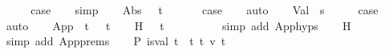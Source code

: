 \begin{isabellebody}
\ \ \isamarkupfalse%
\ \isamarkupfalse%
\ {\isacharquery}{\kern0pt}case\isanewline
\ \ \isamarkupfalse%
\ simp\isanewline
{}\isamarkupfalse%
\isanewline
\ \ \isamarkupfalse%
\ {\isacharparenleft}{\kern0pt}Abs\ {\isasymtau}{}\ {\isasymGamma}\ t\ {\isasymtau}{}{\isacharparenright}{\kern0pt}\isanewline
\ \ \isamarkupfalse%
\ \isamarkupfalse%
\ {\isacharquery}{\kern0pt}case\isanewline
\ \ \isamarkupfalse%
\ auto\isanewline
{}\isamarkupfalse%
\isanewline
\ \ \isamarkupfalse%
\ {\isacharparenleft}{\kern0pt}Val\ {\isasymGamma}{\isacharprime}{\kern0pt}\ s{\isacharparenright}{\kern0pt}\isanewline
\ \ \isamarkupfalse%
\ \isamarkupfalse%
\ {\isacharquery}{\kern0pt}case\isanewline
\ \ \isamarkupfalse%
\ auto\isanewline
{}\isamarkupfalse%
\isanewline
\ \ \isamarkupfalse%
\ {\isacharparenleft}{\kern0pt}App\ {\isasymGamma}{\isacharprime}{\kern0pt}\ t{}\ {\isasymtau}{}\ {\isasymtau}{}\ t{}{\isacharparenright}{\kern0pt}\isanewline
\ \ \isamarkupfalse%
\ H{}{\isacharcolon}{\kern0pt}\ {\isachardoublequoteopen}{\isasymGamma}{\isacharprime}{\kern0pt}\ {\isasymturnstile}\ t{}\ {\isacharcolon}{\kern0pt}\ {\isasymtau}{}\ {\isasymRightarrow}\ {\isasymtau}{}{\isachardoublequoteclose}\isanewline
\ \ \ \ \isamarkupfalse%
\ {\isacharparenleft}{\kern0pt}simp\ add{\isacharcolon}{\kern0pt}\ App{\isachardot}{\kern0pt}hyps{\isacharparenleft}{\kern0pt}{}{\isacharparenright}{\kern0pt}{\isacharparenright}{\kern0pt}\isanewline
\ \ \isamarkupfalse%
\ H{}{\isacharcolon}{\kern0pt}\ {\isachardoublequoteopen}{\isasymGamma}{\isacharprime}{\kern0pt}\ {\isacharequal}{\kern0pt}\ {\isacharbrackleft}{\kern0pt}{\isacharbrackright}{\kern0pt}{\isachardoublequoteclose}\isanewline
\ \ \ \ \isamarkupfalse%
\ {\isacharparenleft}{\kern0pt}simp\ add{\isacharcolon}{\kern0pt}\ App{\isachardot}{\kern0pt}prems{\isacharparenright}{\kern0pt}\isanewline
\ \ \isamarkupfalse%
\ P{}{\isacharcolon}{\kern0pt}\ {\isachardoublequoteopen}is{\isacharunderscore}{\kern0pt}val\ t{}\ {\isasymor}\ {\isacharparenleft}{\kern0pt}{\isasymexists}t{}{\isacharprime}{\kern0pt}{\isachardot}{\kern0pt}\ t{}\ {\isasymrightarrow}\isactrlsub v\ t{}{\isacharprime}{\kern0pt}{\isacharparenright}{\kern0pt}{\isachardoublequoteclose}\isanewline

\end{isabellebody}
